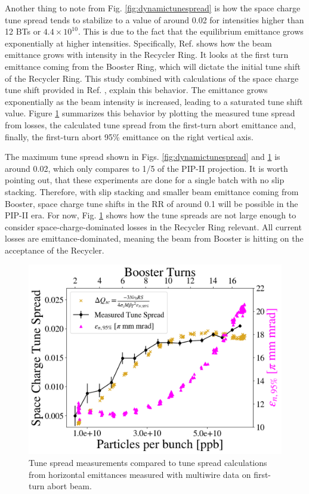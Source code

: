 Another thing to note from Fig. \ref{fig:dynamictunespread} is how the space charge tune spread tends to stabilize to a value of around 0.02 for intensities higher than 12 BTs or $4.4\times 10^{10}$. This is due to the fact that the equilibrium emittance grows exponentially at higher intensities. Specifically, Ref. \cite{betiay} shows how the beam emittance grows with intensity in the Recycler Ring. It looks at the first turn emittance coming from the Booster Ring, which will dictate the initial tune shift of the Recycler Ring. This study combined with calculations of the space charge tune shift provided in Ref. \cite{zhang}, explain this behavior. The emittance grows exponentially as the beam intensity is increased, leading to a saturated tune shift value. Figure \ref{fig:tunespread} summarizes this behavior by plotting the measured tune spread from losses, the calculated tune spread from the first-turn abort emittance and, finally, the first-turn abort 95\% emittance on the right vertical axis.   

The maximum tune spread shown in Figs. \ref{fig:dynamictunespread} and \ref{fig:tunespread} is around 0.02, which only compares to 1/5 of the PIP-II projection. It is worth pointing out, that these experiments are done for a single batch with no slip stacking. Therefore, with slip stacking and smaller beam emittance coming from Booster, space charge tune shifts in the RR of around 0.1 will be possible in the PIP-II era. For now, Fig. \ref{fig:tunespread} shows how the tune spreads are not large enough to consider space-charge-dominated losses in the Recycler Ring relevant. All current losses are emittance-dominated, meaning the beam from Booster is hitting on the acceptance of the Recycler.  

\begin{figure}[H]
    \centering
    \includegraphics[width=\columnwidth]{chapter6/tune_spread.png}
    \caption{Tune spread measurements compared to tune spread calculations from horizontal emittances measured with multiwire data on first-turn abort beam.}
    \label{fig:tunespread}
\end{figure}

